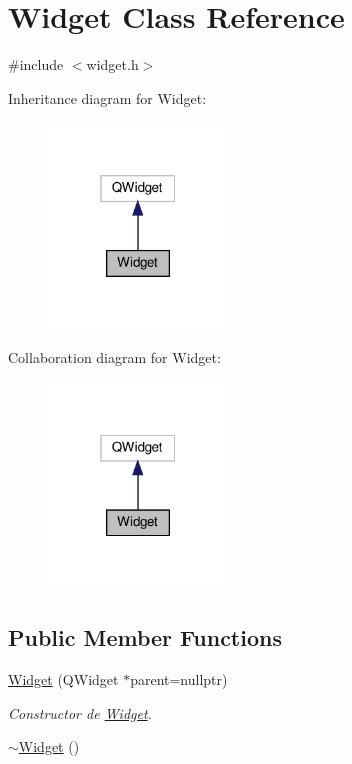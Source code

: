 \hypertarget{class_widget}{}\section{Widget Class Reference}
\label{class_widget}


{\ttfamily \#include $<$widget.\+h$>$}



Inheritance diagram for Widget\+:
\nopagebreak
\begin{figure}[H]
\begin{center}
\leavevmode
\includegraphics[width=135pt]{class_widget__inherit__graph}
\end{center}
\end{figure}


Collaboration diagram for Widget\+:
\nopagebreak
\begin{figure}[H]
\begin{center}
\leavevmode
\includegraphics[width=135pt]{class_widget__coll__graph}
\end{center}
\end{figure}
\subsection*{Public Member Functions}
\begin{DoxyCompactItemize}
\item 
\hyperlink{class_widget_ace1aa23652eb4425355a81760b39fd37}{Widget} (Q\+Widget $\ast$parent=nullptr)
\begin{DoxyCompactList}\small\item\em Constructor de \hyperlink{class_widget}{Widget}. \end{DoxyCompactList}\item 
\hyperlink{class_widget_aa24f66bcbaaec6d458b0980e8c8eae65}{$\sim$\+Widget} ()
\end{DoxyCompactItemize}


